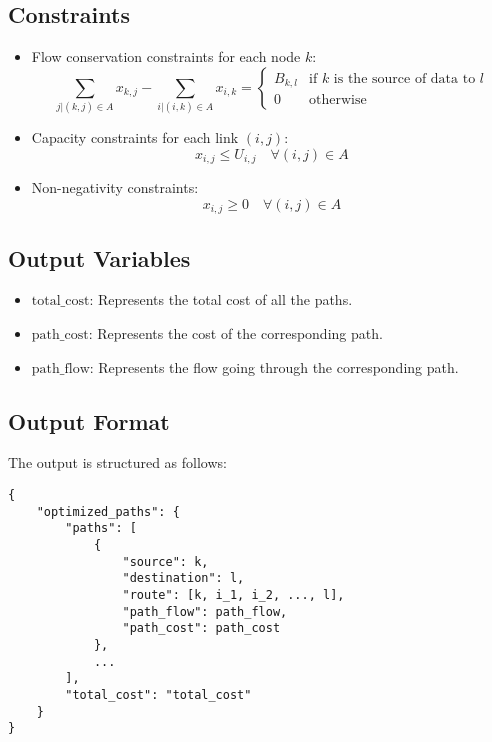 \documentclass{article}
\begin{document}
\subsection*{Constraints}
\begin{itemize}
    \item Flow conservation constraints for each node \( k \):
    \[
    \sum_{j | (k,j) \in A} x_{k,j} - \sum_{i | (i,k) \in A} x_{i,k} = 
    \begin{cases} 
    B_{k,l} & \text{if } k \text{ is the source of data to } l \\
    0 & \text{otherwise} 
    \end{cases}
    \]
    
    \item Capacity constraints for each link \( (i,j) \):
    \[
    x_{i,j} \leq U_{i,j} \quad \forall (i,j) \in A
    \]

    \item Non-negativity constraints:
    \[
    x_{i,j} \geq 0 \quad \forall (i,j) \in A
    \]
\end{itemize}

\subsection*{Output Variables}
\begin{itemize}
    \item \( \text{total\_cost} \): Represents the total cost of all the paths.
    \item \( \text{path\_cost} \): Represents the cost of the corresponding path.
    \item \( \text{path\_flow} \): Represents the flow going through the corresponding path.
\end{itemize}

\subsection*{Output Format}
The output is structured as follows:
\begin{verbatim}
{
    "optimized_paths": {
        "paths": [
            {
                "source": k,
                "destination": l,
                "route": [k, i_1, i_2, ..., l],
                "path_flow": path_flow,
                "path_cost": path_cost
            },
            ...
        ],
        "total_cost": "total_cost"
    }
}
\end{verbatim}
\end{document}
